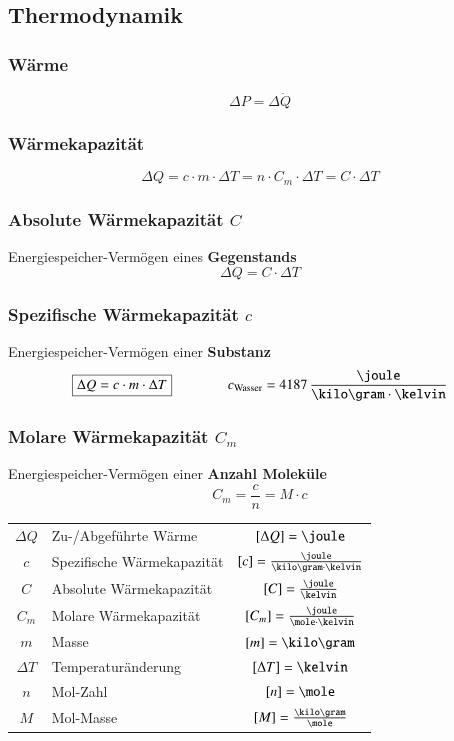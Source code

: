 \subsection{Thermodynamik}

\subsubsection{Wärme}

\vspace{-0.2cm}
$$ \boxed{ \Delta P = \Delta \dot{Q}} $$


\subsubsection{Wärmekapazität}

\vspace{-0.2cm}
$$ \boxed{ \Delta Q = c \cdot m \cdot \Delta T = n \cdot C_m \cdot \Delta T = C \cdot \Delta T }$$


\subsubsection{Absolute Wärmekapazität $C$}

Energiespeicher-Vermögen eines \textbf{Gegenstands}
$$ \boxed{ \Delta Q = C \cdot \Delta T } $$


\subsubsection{Spezifische Wärmekapazität $c$}

Energiespeicher-Vermögen einer \textbf{Substanz}
$$ \boxed{ \Delta Q = c \cdot m \cdot \Delta T  } \qquad \qquad c_{\rm Wasser} = 4187 \, \frac{\joule}{\kilo \gram \cdot \kelvin} $$


\subsubsection{Molare Wärmekapazität $C_m$}

Energiespeicher-Vermögen einer \textbf{Anzahl Moleküle}
$$ \boxed{ C_m = \frac{c}{n} = M \cdot c } $$

\renewcommand{\arraystretch}{1.3}
\begin{tabular}{c l c}
	$\Delta Q$ 	& Zu-/Abgeführte Wärme 			& $[\Delta Q] = \joule$ 							\\
	$c$ 		& Spezifische Wärmekapazität 	& $[c] = \frac{\joule}{\kilo \gram \cdot \kelvin}$ 	\\
	$C$ 		& Absolute Wärmekapazität 		& $[C] = \frac{\joule}{\kelvin}$ 					\\
	$C_m$ 		& Molare Wärmekapazität 		& $[C_m] = \frac{\joule}{\mole \cdot \kelvin}$ 		\\
	$m$ 		& Masse 						& $[m] = \kilo \gram$ 								\\
	$\Delta T$ 	& Temperaturänderung 			& $[\Delta T] = \kelvin$ 							\\
	$n$ 		& Mol-Zahl 						& $[n] = \mole$ 									\\
	$M$ 		& Mol-Masse 					& $[M] = \frac{\kilo \gram}{\mole}$
\end{tabular}
\renewcommand{\arraystretch}{1}

